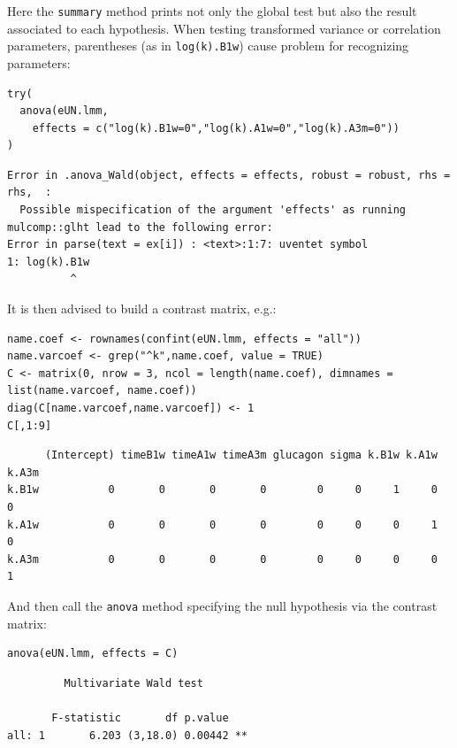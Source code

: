 \documentclass[12pt]{article}
\begin{document}
Here the \texttt{summary} method prints not only the global test but also the
result associated to each hypothesis. When testing transformed
variance or correlation parameters, parentheses (as in \texttt{log(k).B1w})
cause problem for recognizing parameters:
\lstset{language=r,label= ,caption= ,captionpos=b,numbers=none}
\begin{lstlisting}
try(
  anova(eUN.lmm,
	effects = c("log(k).B1w=0","log(k).A1w=0","log(k).A3m=0"))
)
\end{lstlisting}

\begin{verbatim}
Error in .anova_Wald(object, effects = effects, robust = robust, rhs = rhs,  : 
  Possible mispecification of the argument 'effects' as running mulcomp::glht lead to the following error: 
Error in parse(text = ex[i]) : <text>:1:7: uventet symbol
1: log(k).B1w
          ^
\end{verbatim}


\clearpage

It is then advised to build a contrast matrix, e.g.:
\lstset{language=r,label= ,caption= ,captionpos=b,numbers=none}
\begin{lstlisting}
name.coef <- rownames(confint(eUN.lmm, effects = "all"))
name.varcoef <- grep("^k",name.coef, value = TRUE)
C <- matrix(0, nrow = 3, ncol = length(name.coef), dimnames = list(name.varcoef, name.coef))
diag(C[name.varcoef,name.varcoef]) <- 1
C[,1:9]
\end{lstlisting}

\begin{verbatim}
      (Intercept) timeB1w timeA1w timeA3m glucagon sigma k.B1w k.A1w k.A3m
k.B1w           0       0       0       0        0     0     1     0     0
k.A1w           0       0       0       0        0     0     0     1     0
k.A3m           0       0       0       0        0     0     0     0     1
\end{verbatim}


And then call the \texttt{anova} method specifying the null hypothesis via the
contrast matrix:
\lstset{language=r,label= ,caption= ,captionpos=b,numbers=none}
\begin{lstlisting}
anova(eUN.lmm, effects = C)
\end{lstlisting}

\begin{verbatim}
	     Multivariate Wald test 

       F-statistic       df p.value   
all: 1       6.203 (3,18.0) 0.00442 **
\end{verbatim}
\end{document}
